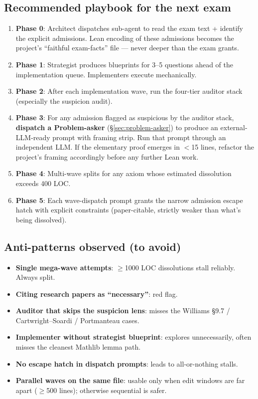 \documentclass[11pt,a4paper]{article}
\theoremstyle{plain}
\theoremstyle{definition}
\begin{document}
\subsection{Recommended playbook for the next exam}

\begin{enumerate}[leftmargin=1.5em]
\item \textbf{Phase 0}: Architect dispatches sub-agent to read the
      exam text + identify the explicit admissions. Lean encoding of
      these admissions becomes the project's ``faithful exam-facts''
      file --- never deeper than the exam grants.
\item \textbf{Phase 1}: Strategist produces blueprints for 3--5
      questions ahead of the implementation queue. Implementers
      execute mechanically.
\item \textbf{Phase 2}: After each implementation wave, run the
      four-tier auditor stack (especially the suspicion audit).
\item \textbf{Phase 3}: For any admission flagged as suspicious by
      the auditor stack, \textbf{dispatch a Problem-asker}
      (\S\ref{sec:problem-asker}) to produce an external-LLM-ready
      prompt with framing strip. Run that prompt through an
      independent LLM. If the elementary proof emerges in $<$15
      lines, refactor the project's framing accordingly before any
      further Lean work.
\item \textbf{Phase 4}: Multi-wave splits for any axiom whose
      estimated dissolution exceeds 400 LOC.
\item \textbf{Phase 5}: Each wave-dispatch prompt grants the narrow
      admission escape hatch with explicit constraints
      (paper-citable, strictly weaker than what's being dissolved).
\end{enumerate}

\subsection{Anti-patterns observed (to avoid)}

\begin{itemize}[leftmargin=1.5em]
\item \textbf{Single mega-wave attempts}: $\geq$1000 LOC dissolutions
      stall reliably. Always split.
\item \textbf{Citing research papers as ``necessary''}: red flag.
\item \textbf{Auditor that skips the suspicion lens}: misses the
      Williams \S 9.7 / Cartwright--Soardi / Portmanteau cases.
\item \textbf{Implementer without strategist blueprint}: explores
      unnecessarily, often misses the cleanest Mathlib lemma path.
\item \textbf{No escape hatch in dispatch prompts}: leads to
      all-or-nothing stalls.
\item \textbf{Parallel waves on the same file}: usable only when
      edit windows are far apart ($\geq$500 lines); otherwise
      sequential is safer.
\end{itemize}
\end{document}
